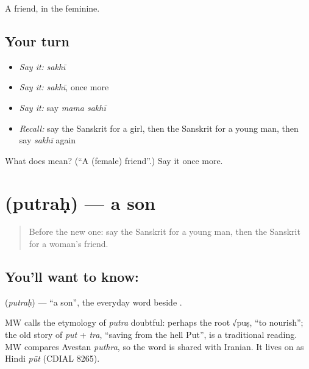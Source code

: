 \begin{grammarlens}[title={What you've built}]
A friend, in the feminine.
\end{grammarlens}

\subsection*{Your turn}
\begin{itemize}
\raggedright
  \item \emph{Say it:} \emph{sakhī}
  \item \emph{Say it:} \emph{sakhī}, once more
  \item \emph{Say it:} say \emph{mama sakhī}
  \item \emph{Recall:} say the Sanskrit for a girl, then the Sanskrit for a young man, then say \emph{sakhī} again
\end{itemize}

\begin{tcolorbox}[breakable,colback=teal!4,colframe=teal!35!black,title={Before you move on}]
What does  mean? (\textquotedblleft{}A (female) friend\textquotedblright{}.) Say it once more.
\end{tcolorbox}
\section[\texorpdfstring{\sk{पुत्रः} (putraḥ)}{पुत्रः (putraḥ)}]{ (putraḥ) — a son}

\label{lesson:SA-C88-son}



\begin{quote}
Before the new one: say the Sanskrit for a young man, then the Sanskrit for a woman's friend.
\end{quote}

\subsection*{You'll want to know: }
\textbf{} (\emph{putraḥ}) — \textquotedblleft{}a son\textquotedblright{}, the everyday word beside \textbf{}.

\begin{cousinweb}
MW calls the etymology of \emph{putra} doubtful: perhaps the root √puṣ, \textquotedblleft{}to nourish\textquotedblright{}; the old story of \emph{put} + \emph{tra}, \textquotedblleft{}saving from the hell Put\textquotedblright{}, is a traditional reading. MW compares Avestan \emph{puthra}, so the word is shared with Iranian. It lives on as Hindi \emph{pūt} (CDIAL 8265).
\end{cousinweb}


